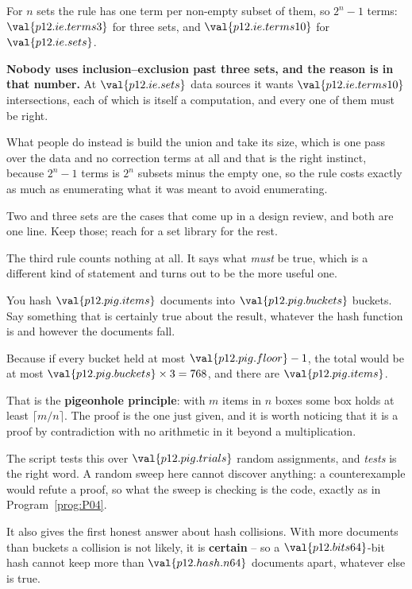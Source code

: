 \begin{fr}
For $n$ sets the rule has one term per non-empty subset of them, so
$2^{n} - 1$ terms: $\val{p12.ie.terms3}$ for three sets, and
$\val{p12.ie.terms10}$ for $\val{p12.ie.sets}$.

\begin{trapbox}
\textbf{Nobody uses inclusion--exclusion past three sets, and the reason is in
that number.} At $\val{p12.ie.sets}$ data sources it wants
$\val{p12.ie.terms10}$ intersections, each of which is itself a computation,
and every one of them must be right.

What people do instead is build the union and take its size, which is one
pass over the data and no correction terms at all \dash{} and that is the
right instinct, because $2^{n}-1$ terms is $2^{n}$ subsets minus the empty
one, so the rule costs exactly as much as enumerating what it was meant to
avoid enumerating.

Two and three sets are the cases that come up in a design review, and both are
one line. Keep those; reach for a set library for the rest.
\end{trapbox}
\end{fr}

\begin{fr}
The third rule counts nothing at all. It says what \emph{must} be true, which
is a different kind of statement and turns out to be the more useful one.

You hash $\val{p12.pig.items}$ documents into $\val{p12.pig.buckets}$ buckets.
Say something that is certainly true about the result, whatever the hash
function is and however the documents fall.
\dotline
\nextframe
\end{fr}

\begin{fr}
Because if every bucket held at most $\val{p12.pig.floor} - 1$, the total
would be at most $\val{p12.pig.buckets} \times 3 = 768$, and there are
$\val{p12.pig.items}$.

That is the \textbf{pigeonhole principle}: with $m$ items in $n$ boxes some
box holds at least $\lceil m/n \rceil$. The proof is the one just given, and
it is worth noticing that it is a proof by contradiction with no arithmetic in
it beyond a multiplication.

\begin{note}
The script tests this over $\val{p12.pig.trials}$ random assignments, and
\emph{tests} is the right word. A random sweep here cannot discover anything:
a counterexample would refute a proof, so what the sweep is checking is the
code, exactly as in Program~\ref{prog:P04}.
\end{note}

It also gives the first honest answer about hash collisions. With more
documents than buckets a collision is not likely, it is \textbf{certain} --
so a $\val{p12.bits64}$-bit hash cannot keep more than
$\val{p12.hash.n64}$ documents apart, whatever else is true.
\end{fr}

